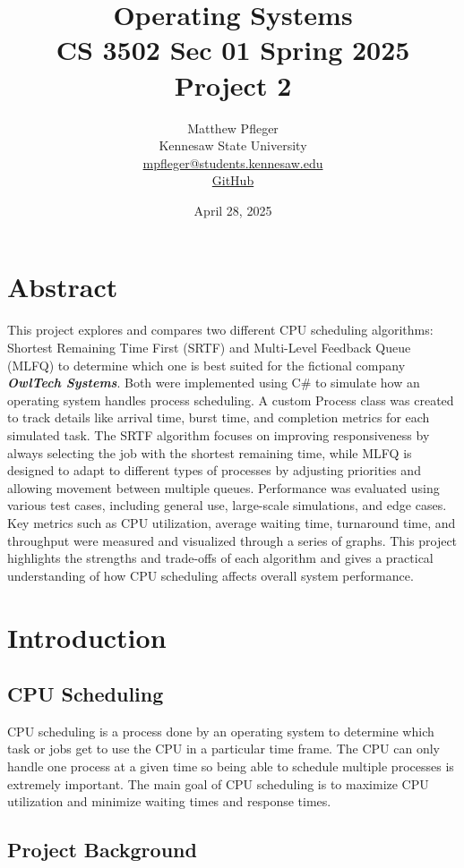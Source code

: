 \documentclass[11pt]{article}
\title{Operating Systems \\
CS 3502 Sec 01 Spring 2025 \\
Project 2}
\author{Matthew Pfleger \\
Kennesaw State University \\
\href{mailto:mpfleger@students.kennesaw.edu}{mpfleger@students.kennesaw.edu} \\
\href{https://github.com/mpfleger1/CS-3502-Operating-Systems-Project-2}{GitHub}}
\date{April 28, 2025}
\begin{document}
\maketitle

\section{Abstract}

This project explores and compares two different CPU scheduling algorithms: Shortest Remaining Time First (SRTF) and Multi-Level Feedback Queue (MLFQ) to determine which one is best suited for the fictional company \textbf{\textit{OwlTech Systems}}. Both were implemented using C\# to simulate how an operating system handles process scheduling. A custom Process class was created to track details like arrival time, burst time, and completion metrics for each simulated task. The SRTF algorithm focuses on improving responsiveness by always selecting the job with the shortest remaining time, while MLFQ is designed to adapt to different types of processes by adjusting priorities and allowing movement between multiple queues. Performance was evaluated using various test cases, including general use, large-scale simulations, and edge cases. Key metrics such as CPU utilization, average waiting time, turnaround time, and throughput were measured and visualized through a series of graphs. This project highlights the strengths and trade-offs of each algorithm and gives a practical understanding of how CPU scheduling affects overall system performance.


\tableofcontents
\newpage

\section{Introduction}

\subsection{CPU Scheduling}

CPU scheduling is a process done by an operating system to determine which task or jobs get to use the CPU in a particular time frame. The CPU can only handle one process at a given time so being able to schedule multiple processes is extremely important. The main goal of CPU scheduling is to maximize CPU utilization and minimize waiting times and response times.

\subsection{Project Background}
\end{document}
